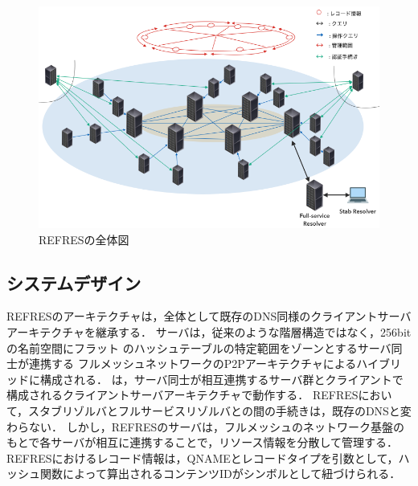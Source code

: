 \begin{figure}[t]
 \centering
 \label{fig:abstruct-REFRES-architecture}
 \includegraphics[scale=0.5]{figure/abstruct-architecture.png}
 \caption{REFRESの全体図}
\end{figure}


\subsection{システムデザイン}
REFRESのアーキテクチャは，全体として既存のDNS同様のクライアントサーバアーキテクチャを継承する．
サーバは，従来のような階層構造ではなく，256bitの名前空間にフラット
のハッシュテーブルの特定範囲をゾーンとするサーバ同士が連携する
フルメッシュネットワークのP2Pアーキテクチャによるハイブリッドに構成される．
は，サーバ同士が相互連携するサーバ群とクライアントで構成されるクライアントサーバアーキテクチャで動作する．
REFRESにおいて，スタブリゾルバとフルサービスリゾルバとの間の手続きは，既存のDNSと変わらない．
しかし，REFRESのサーバは，フルメッシュのネットワーク基盤のもとで各サーバが相互に連携することで，リソース情報を分散して管理する．
REFRESにおけるレコード情報は，QNAMEとレコードタイプを引数として，ハッシュ関数によって算出されるコンテンツIDがシンボルとして紐づけられる．

